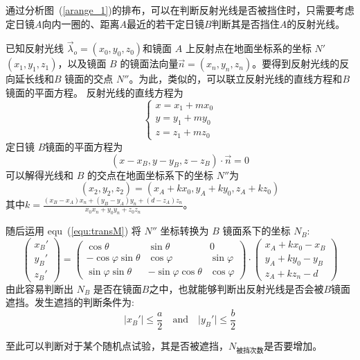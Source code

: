 \documentclass[../main.tex]{subfiles}
\begin{document}
\begin{itemize}
通过分析图~(\ref{arange_1})的排布，可以在判断反射光线是否被挡住时，只需要考虑定日镜\(A\)向内一圈的、距离\(A\)最近的若干定日镜\(B\)判断其是否挡住\(A\)的反射光线。

已知反射光线 \(\vec \lambda _{o} = (x_0,y_0,z_0)\)和镜面 \(A\) 上反射点在地面坐标系的坐标 \(N'\)\((x_1, y_1, z_1)\)，以及镜面 \(B\) 的镜面法向量\(\vec n = (x_{n} , y_{n} ,z_{n})\)。要得到反射光线的反向延长线和\(B\) 镜面的交点 \(N''\)。为此，类似的，可以联立反射光线的直线方程和\(B\)镜面的平面方程。
反射光线的直线方程为
\[
\begin{cases}
x = x_1 + m x_0\\
y = y_1 + m y_0\\
z = z_1 + m z_0
\end{cases}
\]
定日镜 \(B\)镜面的平面方程为
\[
(x - x_{B} , y - y_{B} , z-z_{B}) \cdot \vec n = 0
\]
可以解得光线和 \(B\) 的交点在地面坐标系下的坐标 \(N''\)为
\[
(x_2 , y_2, z_2) = (x_{A} + k x_0, y_{A} + ky_{0} , z_{A} + kz_{0})
\]
其中\(k = \displaystyle \frac{(x_{B} - x_{A}) x_{n} + (y_{B} - y_{A}) y_{n} + (d- z_{A}) z_{n}}{x_0 x_{n} + y_{0} y_{n} + z_{0} z _{n}}\)。

随后运用 equ~(\ref{equ:transM}) 将 \(N''\) 坐标转换为 \(B\) 镜面系下的坐标 \(N_{B}\):
\[
\begin{pmatrix}
x_{B} '\\
y_{B} '\\
z _{B} '
\end{pmatrix}
=
\begin{pmatrix}
\cos \theta & \sin \theta & 0\\
-\cos \varphi \sin \theta & \cos \varphi & \sin \varphi \\
\sin \varphi \sin \theta & - \sin \varphi \cos \theta & \cos \varphi
\end{pmatrix}
\cdot
\begin{pmatrix}
x_{A} + kx_0 - x_{B}\\
y_{A} + ky_{0} - y_{B}\\
z_{A} + kz_{n} - d
\end{pmatrix}
\]
由此容易判断出 \(N_{B}\) 是否在镜面\(B\)之中，也就能够判断出反射光线是否会被\(B\)镜面遮挡。发生遮挡的判断条件为:
\begin{equation}
\vert x_{B}' \vert \le \frac{a}{2}\quad \text{and} \quad \vert y_{B}' \vert \le \frac{b}{2}
\end{equation}
\end{itemize}

至此可以判断对于某个随机点试验，其是否被遮挡，\(N_{\text{被挡次数}}\)是否要增加。
\end{document}

